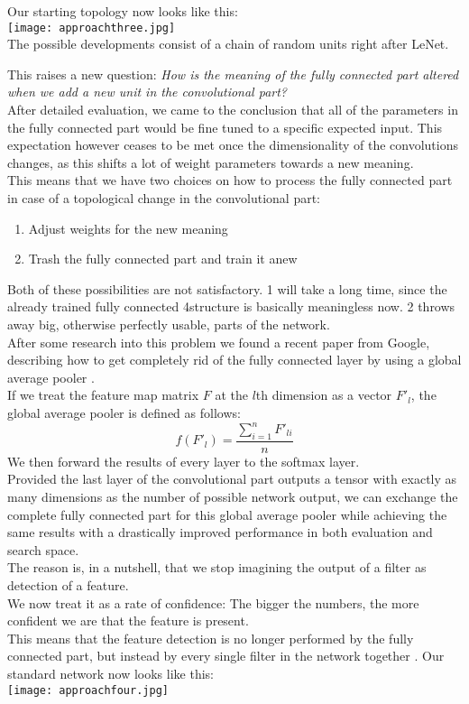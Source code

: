 Our starting topology now looks like this:\\
\texttt{[image: approachthree.jpg]}\\
The possible developments consist of a chain of random units right after LeNet.

This raises a new question: \emph{How is the meaning of the fully connected part altered when we add a new unit in the convolutional part?}\\
After detailed evaluation, we came to the conclusion that all of the parameters in the fully connected part would be fine tuned to a specific expected input. This expectation however ceases to be met once the dimensionality of the convolutions changes, as this shifts a lot of weight parameters towards a new meaning.\\
This means that we have two choices on how to process the fully connected part in case of a topological change in the convolutional part:
\begin{enumerate}
	\item{Adjust weights for the new meaning}
	\item{Trash the fully connected part and train it anew}
\end{enumerate}  
Both of these possibilities are not satisfactory. 1 will take a long time, since the already trained fully connected 4structure is basically meaningless now. 2 throws away big, otherwise perfectly usable, parts of the network.\\
After some research into this problem we found a recent paper from Google, describing how to get completely rid of the fully connected layer by using a global average pooler \cite{Lin2014}.\\
If we treat the feature map matrix \(F\) at the \(l\)th dimension as a vector \(F'_l\), the global average pooler is defined as follows:
\[ f(F'_l) = \frac{\sum_{i = 1}^{n} F'_{li}}{n} \]
We then forward the results of every layer to the softmax layer.\\
Provided the last layer of the convolutional part outputs a tensor with exactly as many dimensions as the number of possible network output, we can exchange the complete fully connected part for this global average pooler while achieving the same results with a drastically improved performance in both evaluation and search space. \cite{Lin2014}\\
The reason is, in a nutshell, that we stop imagining the output of a filter as detection of a feature.\\
We now treat it as a rate of confidence: The bigger the numbers, the more confident we are that the feature is present.\\
This means that the feature detection is no longer performed by the fully connected part, but instead by every single filter in the network together \cite{Lin2014}.
Our standard network now looks like this:\\
\texttt{[image: approachfour.jpg]}\\

